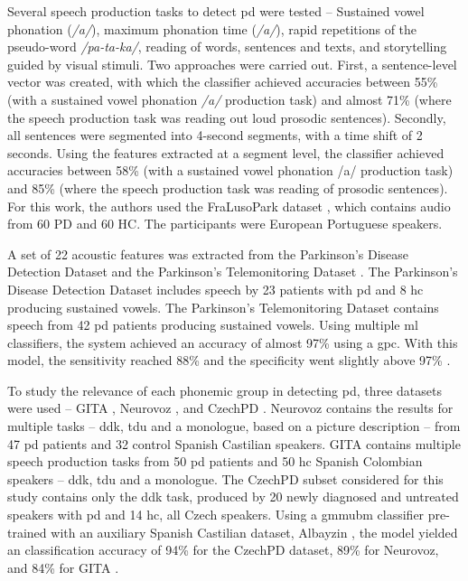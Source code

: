 Several speech production tasks to detect \gls{pd} were tested \cite{parkinson_acoustic_pompilli} -- Sustained vowel phonation (\textit{/a/}), maximum phonation time (\textit{/a/}), rapid repetitions of the pseudo-word \textit{/pa-ta-ka/}, reading of words, sentences and texts, and storytelling guided by visual stimuli. Two approaches were carried out. First, a sentence-level vector was created, with which the classifier achieved accuracies between 55\% (with a sustained vowel phonation \textit{/a/} production task) and almost 71\% (where the speech production task was reading out loud prosodic sentences). Secondly, all sentences were segmented into 4-second segments, with a time shift of 2 seconds. Using the features extracted at a segment level, the classifier achieved accuracies between 58\% (with a sustained vowel phonation /a/ production task) and 85\% (where the speech production task was reading of prosodic sentences). For this work, the authors used the FraLusoPark dataset \cite{fralusopark}, which contains audio from 60 PD and 60 HC. The participants were European Portuguese speakers.

A set of 22 acoustic features was extracted from the Parkinson’s Disease Detection Dataset \cite{PDDD} and the Parkinson’s Telemonitoring Dataset \cite{PTD}. The Parkinson’s Disease Detection Dataset includes speech by 23 patients with \gls{pd} and 8 \gls{hc} producing sustained vowels. The Parkinson’s Telemonitoring Dataset contains speech from 42 \gls{pd} patients producing sustained vowels. Using multiple \gls{ml} classifiers, the system achieved an accuracy of almost 97\% using a \gls{gpc}. With this model, the sensitivity reached 88\% and the specificity went slightly above 97\% \cite{parkinson_acoustic_despotovic}.

To study the relevance of each phonemic group in detecting \gls{pd}, three datasets were used -- GITA \cite{GITA}, Neurovoz \cite{Neurovoz}, and CzechPD \cite{CzechPD}. Neurovoz contains the results for multiple tasks -- \gls{ddk}, \gls{tdu} and a monologue, based on a picture description -- from 47 \gls{pd} patients and 32 control Spanish Castilian speakers. GITA contains multiple speech production tasks from 50 \gls{pd} patients and 50 \gls{hc} Spanish Colombian speakers -- \gls{ddk}, \gls{tdu} and a monologue. The CzechPD subset considered for this study contains only the \gls{ddk} task, produced by 20 newly diagnosed and untreated speakers with \gls{pd} and 14 \gls{hc}, all Czech speakers. Using a \gls{gmmubm} classifier pre-trained with an auxiliary Spanish Castilian dataset, Albayzin \cite{Albayzin}, the model yielded an classification accuracy of 94\% for the CzechPD dataset, 89\% for Neurovoz, and 84\% for GITA \cite{parkinson_phonemic_relevance}. 

